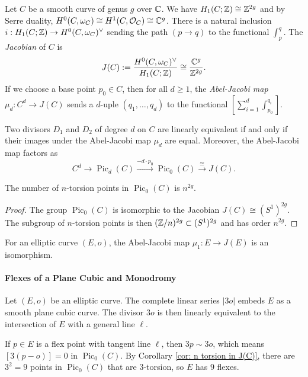 \documentclass[11pt]{amsart}
\begin{document}
Let $C$ be a smooth curve of genus $g$ over $\mathbb{C}$. We have $H_1(C;\mathbb{Z}) \cong \mathbb{Z}^{2g}$ and by Serre duality, $H^0(C, \omega_C) \cong H^1(C, \mathcal{O}_C) \cong \mathbb{C}^g$. There is a natural inclusion $i: H_1(C;\mathbb{Z}) \to H^0(C, \omega_C)^\vee$ sending the path $(p\to q)$ to the functional $\int_p^q$. The \textit{Jacobian} of $C$ is $$J(C):= \frac{H^0(C, \omega_C)^\vee}{H_1(C; \mathbb{Z})} \cong \frac{\mathbb{C}^g}{\mathbb{Z}^{2g}}.$$
If we choose a base point $p_0\in C$, then for all $d\geq 1$, the \textit{Abel-Jacobi map} $\mu_d: C^d\to J(C)$ sends a $d$-uple $(q_1, \dots, q_d)$ to the functional $\left[\sum_{i = 1}^d \int_{p_0}^{q_i}\right]$.
\begin{theorem}
    Two divisors $D_1$ and $D_2$ of degree $d$ on $C$ are linearly equivalent if and only if their images under the Abel-Jacobi map $\mu_d$ are equal. Moreover, the Abel-Jacobi map factors as $$C^d\to \operatorname{Pic}_d(C)\overset{-d\cdot p_0}{\longrightarrow} \operatorname{Pic}_0(C) \overset{\cong}{\to} J(C).$$
\end{theorem}
\begin{corollary} \label{cor: n torsion in J(C)}
    The number of $n$-torsion points in $\operatorname{Pic}_0(C)$ is $n^{2g}$.
\end{corollary}

\begin{proof}
    The group $\operatorname{Pic}_0(C)$ is isomorphic to the Jacobian $J(C)\cong (S^1)^{2g}$. The subgroup of $n$-torsion points is then $(\mathbb{Z}/n)^{2g} \subset (S^1)^{2g}$ and has order $n^{2g}$.
\end{proof}

\begin{proposition}
    For an elliptic curve $(E, o)$, the Abel-Jacobi map $\mu_1: E \to J(E)$ is an isomorphism. 
\end{proposition}

\paragraph{\textbf{Flexes of a Plane Cubic and Monodromy}}

Let $(E,o)$ be an elliptic curve. The complete linear series $|3o|$ embeds $E$ as a smooth plane cubic curve. The divisor $3o$ is then linearly equivalent to the intersection of $E$ with a general line $\ell$. 

If $p\in E$ is a flex point with tangent line $\ell$, then $3p\sim 3o$, which means $[3(p-o)]= 0$ in $\operatorname{Pic}_0(C)$. By Corollary \ref{cor: n torsion in J(C)}, there are $3^2 = 9$ points in $\operatorname{Pic}_0(C)$ that are $3$-torsion, so $E$ has $9$ flexes. 
\end{document}
